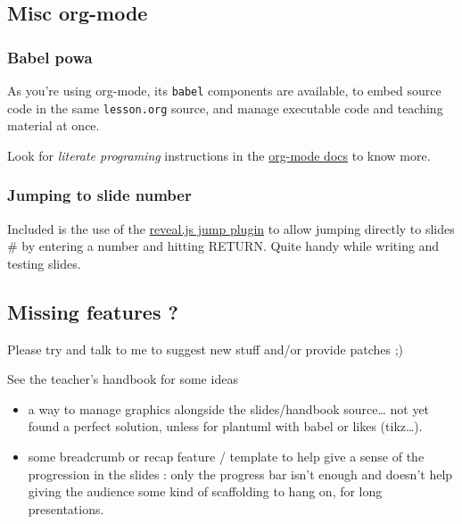 \documentclass[a4paper]{article}
\newenvironment{NOTES}{\begin{lrbox}{\mybox}\begin{minipage}{0.9\textwidth}\begin{shaded}}{\end{shaded}\end{minipage}\end{lrbox}\fbox{\usebox{\mybox}}}
\begin{document}
\subsection{Misc org-mode}
\label{sec:org3cb326c}

\subsubsection{Babel powa}
\label{sec:org0f0d079}
As you're using org-mode, its \texttt{babel} components are available, to embed source code in the same \texttt{lesson.org} source, and manage executable code and teaching material at once.

Look for \emph{literate programing} instructions in the \href{http://orgmode.org/manual/Working-with-source-code.html}{org-mode docs} to know more.

\subsubsection{Jumping to slide number}
\label{sec:org066df6e}

Included is the use of the
\href{https://github.com/SethosII/reveal.js-jump-plugin}{reveal.js jump
plugin} to allow jumping directly to slides \# by entering a number
and hitting RETURN. Quite handy while writing and testing slides.

\subsection{Missing features ?}
\label{sec:org342e553}

Please try and talk to me to suggest new stuff and/or provide patches ;)

\begin{NOTES}
See the teacher's handbook for some ideas

\begin{itemize}
\item a way to manage graphics alongside the slides/handbook source\ldots{} not yet found a perfect solution, unless for plantuml with babel or likes (tikz\ldots{}).

\item some breadcrumb or recap feature / template to help give a sense of
the progression in the slides : only the progress bar isn't enough
and doesn't help giving the audience some kind of scaffolding to
hang on, for long presentations.
\end{itemize}
\end{NOTES}
\end{document}
